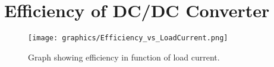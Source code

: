 \documentclass[a4paper,12pt]{article}
\begin{document}

\section{Efficiency of DC/DC Converter}

\begin{figure}[h]
\begin{center}
\texttt{[image: graphics/Efficiency\_vs\_LoadCurrent.png]}
\caption{Graph showing efficiency in function of load current.}
\end{center}
\end{figure}
\end{document}
